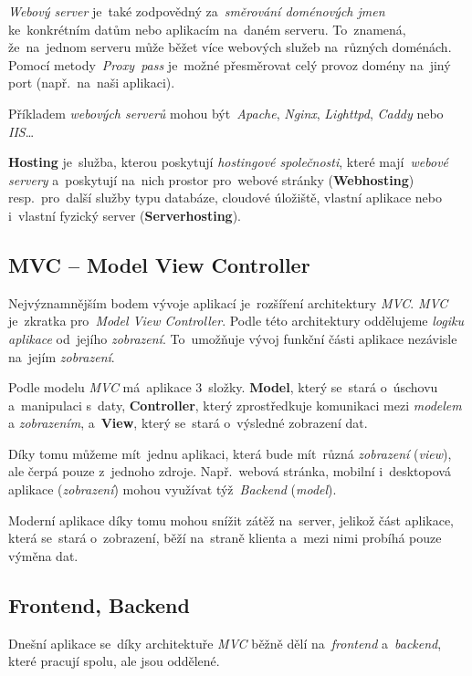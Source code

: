 \documentclass[10pt,a4paper]{article}
\begin{document}
            \emph{Webový server} je~také zodpovědný za~\emph{směrování doménových jmen} ke~konkrétním datům nebo aplikacím na~daném serveru. To~znamená, že~na~jednom serveru může běžet více webových služeb na~různých doménách. Pomocí metody~\emph{Proxy~pass} je~možné přesměrovat celý provoz domény na~jiný port (např.~na~naši aplikaci). \cite{webserver:mdn}

            Příkladem \emph{webových serverů} mohou být~\emph{Apache}, \emph{Nginx}, \emph{Lighttpd}, \emph{Caddy} nebo \emph{IIS}\dots

            \textbf{Hosting} je~služba, kterou poskytují \emph{hostingové společnosti}, které mají~\emph{webové servery} a~poskytují na~nich prostor pro~webové stránky (\textbf{Webhosting}) resp.~pro~další služby typu databáze, cloudové úložiště, vlastní aplikace nebo i~vlastní fyzický server (\textbf{Serverhosting}). \cite{dockernginxperformance}
        
        \subsection{MVC -- Model View Controller}
            Nejvýznamnějším bodem vývoje aplikací je~rozšíření architektury \emph{MVC}. \emph{MVC} je~zkratka pro~\emph{Model View Controller}. Podle této architektury oddělujeme \emph{logiku aplikace} od~jejího \emph{zobrazení}. To~umožňuje vývoj funkční části aplikace nezávisle na~jejím \emph{zobrazení}.

            Podle modelu \emph{MVC} má~aplikace 3~složky. \textbf{Model}, který se~stará o~úschovu a~manipulaci s~daty, \textbf{Controller}, který zprostředkuje komunikaci mezi \emph{modelem} a \emph{zobrazením}, a~\textbf{View}, který se~stará o~výsledné zobrazení dat. \cite{MVC}
            
            Díky tomu můžeme mít~jednu aplikaci, která bude mít~různá \emph{zobrazení} (\emph{view}), ale čerpá pouze z~jednoho zdroje. Např.~webová stránka, mobilní i~desktopová aplikace (\emph{zobrazení}) mohou využívat týž~\emph{Backend} (\emph{model}).
            
            Moderní aplikace díky tomu mohou snížit zátěž na~server, jelikož část aplikace, která se~stará o~zobrazení, běží na~straně klienta a~mezi nimi probíhá pouze výměna dat.

        \subsection{Frontend, Backend}
            Dnešní aplikace se~díky architektuře \emph{MVC} běžně dělí na~\emph{frontend} a~\emph{backend}, které pracují spolu, ale jsou oddělené.
\end{document}
